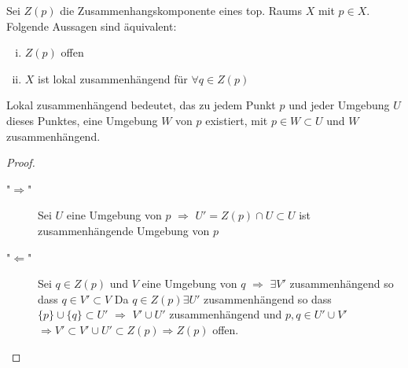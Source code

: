 \documentclass[ngerman, parskip=half, titlepage=false]{scrartcl}
\begin{document}
\begin{Satz}
  Sei $Z(p)$ die Zusammenhangskomponente eines top. Raums $X$ mit $p \in X$.
  Folgende Aussagen sind äquivalent:
  \begin{enumerate}[i)]
    \item $Z(p)$ offen
    \item $X$ ist lokal zusammenhängend für $\forall q \in Z(p)$
  \end{enumerate}
  Lokal zusammenhängend bedeutet, das zu jedem Punkt $p$ und jeder Umgebung $U$
  dieses Punktes, eine Umgebung $W$ von $p$ existiert, mit $p \in W \subset U$
  und $W$ zusammenhängend.
  \begin{proof}
    \begin{description}
      \item["$\Rightarrow$"] Sei $U$ eine Umgebung von $p$ $\Rightarrow$ $U'=
        Z(p) \cap U \subset U$ ist zusammenhängende Umgebung von $p$
      \item["$\Leftarrow$"] Sei $q \in Z(p)$ und $V$ eine Umgebung von $q$ 
        $\Rightarrow$ $\exists V'$ zusammenhängend so dass $q \in V' \subset V$
        Da $q \in Z(p) \exists U'$ zusammenhängend so dass $\{ p  \} \cup \{ q  \}
        \subset U'$ $\Rightarrow$  $V' \cup U'$ zusammenhängend und $p,q \in 
        U' \cup V'$ $\Rightarrow V' \subset V' \cup U' \subset Z(p) \Rightarrow
        Z(p)$   offen.
    \end{description}
  \end{proof}
\end{Satz}
\end{document}

